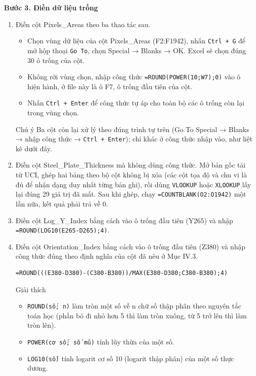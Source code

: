 \documentclass[12pt]{article}
\begin{document}
\textbf{Bước 3. Điền dữ liệu trống}
\begin{enumerate}
    \item Điền cột Pixels\_Areas theo ba thao tác sau.
    \begin{itemize}
        \item Chọn vùng dữ liệu của cột Pixels\_Areas (F2:F1942), nhấn \texttt{Ctrl + G} để mở hộp thoại \texttt{Go To}, chọn Special → Blanks → OK. Excel sẽ chọn đúng 30 ô trống của cột.
        \item Không rời vùng chọn, nhập công thức \texttt{=ROUND(POWER(10;W7);0)} vào ô hiện hành, ở file này là ô F7, ô trống đầu tiên của cột.
        \item Nhấn \texttt{Ctrl + Enter} để công thức tự áp cho toàn bộ các ô trống còn lại trong vùng chọn.
    \end{itemize}
    \begin{guidelinebox}{Chú ý}
    Ba cột còn lại xử lý theo đúng trình tự trên (Go To Special → Blanks → nhập công thức → \texttt{Ctrl + Enter}); chỉ khác ở công thức nhập vào, như liệt kê dưới đây.
    \end{guidelinebox}

    \item Điền cột Steel\_Plate\_Thickness mà không dùng công thức. Mở bản gốc tải từ UCI, ghép hai bảng theo bộ cột không bị xóa (các cột tọa độ và chu vi là đủ để nhận dạng duy nhất từng bản ghi), rồi dùng \texttt{VLOOKUP} hoặc \texttt{XLOOKUP} lấy lại đúng 29 giá trị đã mất. Sau khi ghép, chạy \texttt{=COUNTBLANK(O2:O1942)} một lần nữa, kết quả phải trả về 0.

    \item Điền cột Log\_Y\_Index bằng cách vào ô trống đầu tiên (Y265) và nhập \texttt{=ROUND(LOG10(E265-D265);4)}.

    \item Điền cột Orientation\_Index bằng cách vào ô trống đầu tiên (Z380) và nhập công thức đúng theo định nghĩa của cột đã nêu ở Mục IV.3.
    \begin{aivncodebox}[ô Z380]
    \begin{lstlisting}[language=Excel]
=ROUND(((E380-D380)-(C380-B380))/MAX(E380-D380;C380-B380);4)\end{lstlisting}
    \end{aivncodebox}

    \begin{guidelinebox}{Giải thích}
    \begin{itemize}
        \item \texttt{ROUND(số; n)} làm tròn một số về n chữ số thập phân theo nguyên tắc toán học (phần bỏ đi nhỏ hơn 5 thì làm tròn xuống, từ 5 trở lên thì làm tròn lên).
        \item \texttt{POWER(cơ số; số mũ)} tính lũy thừa của một số.
        \item \texttt{LOG10(số)} tính logarit cơ số 10 (logarit thập phân) của một số thực dương.
    \end{itemize}
    \end{guidelinebox}
\end{enumerate}
\end{document}
